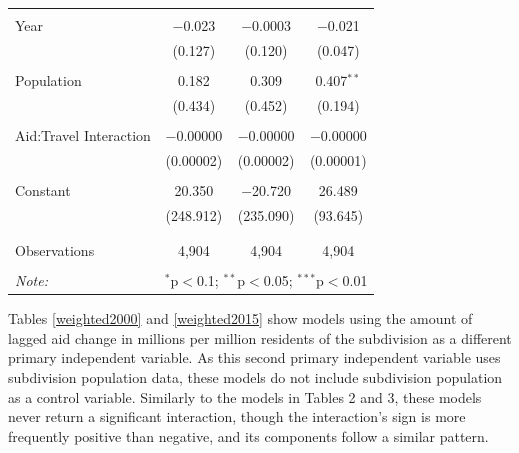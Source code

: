 \documentclass[12pt, letterpaper]{article}
\begin{document}
\begin{table}[!htbp]
\begin{tabular}{@{\extracolsep{5pt}}lccc}
& & & \\ 
Year & $-$0.023 & $-$0.0003 & $-$0.021 \\ 
& (0.127) & (0.120) & (0.047) \\ 
& & & \\ 
Population & 0.182 & 0.309 & 0.407$^{**}$ \\ 
& (0.434) & (0.452) & (0.194) \\ 
& & & \\ 
Aid:Travel Interaction & $-$0.00000 & $-$0.00000 & $-$0.00000 \\ 
& (0.00002) & (0.00002) & (0.00001) \\ 
& & & \\ 
Constant & 20.350 & $-$20.720 & 26.489 \\ 
& (248.912) & (235.090) & (93.645) \\ 
& & & \\ 
\hline \\[-1.8ex] 
Observations & 4,904 & 4,904 & 4,904 \\ 
\hline 
\hline \\[-1.8ex] 
\textit{Note:}  & \multicolumn{3}{r}{$^{*}$p$<$0.1; $^{**}$p$<$0.05; $^{***}$p$<$0.01} \\ 
	\end{tabular} 
	\label{yearly2015pop}
\end{table} 

\newpage

Tables \ref{weighted2000} and \ref{weighted2015} show models using the amount of lagged aid change in millions per million residents of the subdivision as a different primary independent variable. As this second primary independent variable uses subdivision population data, these models do not include subdivision population as a control variable. Similarly to the models in Tables 2 and 3, these models never return a significant interaction, though the interaction’s sign is more frequently positive than negative, and its components follow a similar pattern.  
\end{document}
